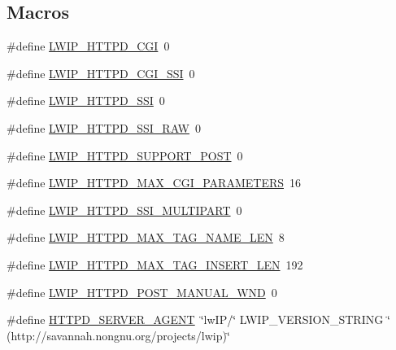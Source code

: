 \subsection*{Macros}
\begin{DoxyCompactItemize}
\item 
\#define \hyperlink{group__httpd__opts_gafb28f7c5fee75f013a199d427452372c}{L\+W\+I\+P\+\_\+\+H\+T\+T\+P\+D\+\_\+\+C\+GI}~0
\item 
\#define \hyperlink{group__httpd__opts_gad3960bf65731bd0f1341867664afe860}{L\+W\+I\+P\+\_\+\+H\+T\+T\+P\+D\+\_\+\+C\+G\+I\+\_\+\+S\+SI}~0
\item 
\#define \hyperlink{group__httpd__opts_gacb70e0cdd30a940f8bce681c6cc63949}{L\+W\+I\+P\+\_\+\+H\+T\+T\+P\+D\+\_\+\+S\+SI}~0
\item 
\#define \hyperlink{group__httpd__opts_ga520858778b84d4d2fa125294c0f119e5}{L\+W\+I\+P\+\_\+\+H\+T\+T\+P\+D\+\_\+\+S\+S\+I\+\_\+\+R\+AW}~0
\item 
\#define \hyperlink{group__httpd__opts_gacbea06ce33933e3ef2f2f1834a21cc2c}{L\+W\+I\+P\+\_\+\+H\+T\+T\+P\+D\+\_\+\+S\+U\+P\+P\+O\+R\+T\+\_\+\+P\+O\+ST}~0
\item 
\#define \hyperlink{group__httpd__opts_ga872adc1562d87d8b445f2231d5bab77a}{L\+W\+I\+P\+\_\+\+H\+T\+T\+P\+D\+\_\+\+M\+A\+X\+\_\+\+C\+G\+I\+\_\+\+P\+A\+R\+A\+M\+E\+T\+E\+RS}~16
\item 
\#define \hyperlink{group__httpd__opts_ga3167d52d20cf90857e2c809b92458bf0}{L\+W\+I\+P\+\_\+\+H\+T\+T\+P\+D\+\_\+\+S\+S\+I\+\_\+\+M\+U\+L\+T\+I\+P\+A\+RT}~0
\item 
\#define \hyperlink{group__httpd__opts_gacb2d74a4aa50287cf55c93d0aa4bcee1}{L\+W\+I\+P\+\_\+\+H\+T\+T\+P\+D\+\_\+\+M\+A\+X\+\_\+\+T\+A\+G\+\_\+\+N\+A\+M\+E\+\_\+\+L\+EN}~8
\item 
\#define \hyperlink{group__httpd__opts_ga9764ba9504923caf9cdd483479334ef5}{L\+W\+I\+P\+\_\+\+H\+T\+T\+P\+D\+\_\+\+M\+A\+X\+\_\+\+T\+A\+G\+\_\+\+I\+N\+S\+E\+R\+T\+\_\+\+L\+EN}~192
\item 
\#define \hyperlink{group__httpd__opts_ga81de5c62c846e73ab59c4cb46264fd6f}{L\+W\+I\+P\+\_\+\+H\+T\+T\+P\+D\+\_\+\+P\+O\+S\+T\+\_\+\+M\+A\+N\+U\+A\+L\+\_\+\+W\+ND}~0
\item 
\#define \hyperlink{group__httpd__opts_gafb2115e763ed3163a3e204a0ba53edb9}{H\+T\+T\+P\+D\+\_\+\+S\+E\+R\+V\+E\+R\+\_\+\+A\+G\+E\+NT}~\char`\"{}lw\+IP/\char`\"{} L\+W\+I\+P\+\_\+\+V\+E\+R\+S\+I\+O\+N\+\_\+\+S\+T\+R\+I\+NG \char`\"{} (http\+://savannah.\+nongnu.\+org/projects/lwip)\char`\"{}
\item 

\end{DoxyCompactItemize}
